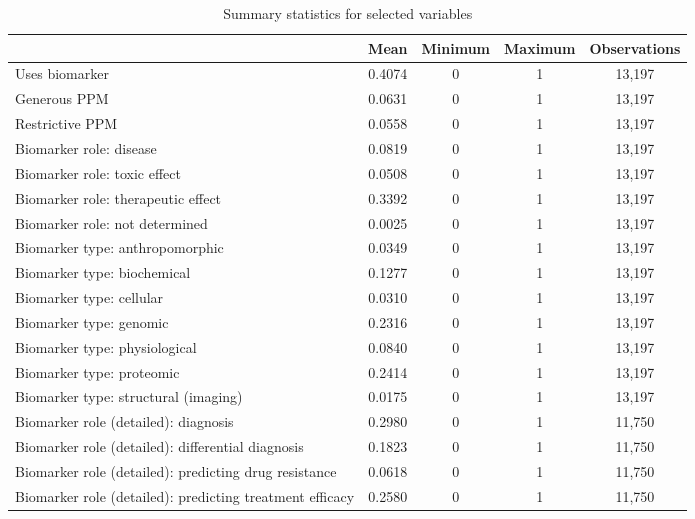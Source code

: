 \begin{table}[htbp]\centering
\def\sym#1{\ifmmode^{#1}\else\(^{#1}\)\fi}
\caption{Summary statistics for selected variables}
\begin{tabular}{l*{1}{cccc}}
\hline\hline
                    &        Mean&     Minimum&     Maximum&Observations\\
\hline
Uses biomarker      &      0.4074&           0&           1&      13,197\\
Generous PPM        &      0.0631&           0&           1&      13,197\\
Restrictive PPM     &      0.0558&           0&           1&      13,197\\
Biomarker role: disease&      0.0819&           0&           1&      13,197\\
Biomarker role: toxic effect&      0.0508&           0&           1&      13,197\\
Biomarker role: therapeutic effect&      0.3392&           0&           1&      13,197\\
Biomarker role: not determined&      0.0025&           0&           1&      13,197\\
Biomarker type: anthropomorphic&      0.0349&           0&           1&      13,197\\
Biomarker type: biochemical&      0.1277&           0&           1&      13,197\\
Biomarker type: cellular&      0.0310&           0&           1&      13,197\\
Biomarker type: genomic&      0.2316&           0&           1&      13,197\\
Biomarker type: physiological&      0.0840&           0&           1&      13,197\\
Biomarker type: proteomic&      0.2414&           0&           1&      13,197\\
Biomarker type: structural (imaging)&      0.0175&           0&           1&      13,197\\
Biomarker role (detailed): diagnosis&      0.2980&           0&           1&      11,750\\
Biomarker role (detailed): differential diagnosis&      0.1823&           0&           1&      11,750\\
Biomarker role (detailed): predicting drug resistance&      0.0618&           0&           1&      11,750\\
Biomarker role (detailed): predicting treatment efficacy&      0.2580&           0&           1&      11,750\\

\end{tabular}
\end{table}
